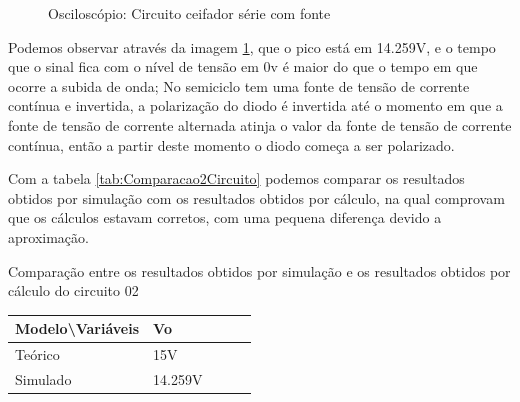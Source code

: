 \begin{figure}[H]
    \centering
    \caption{Osciloscópio: Circuito ceifador série com fonte}
    \vspace{-0.3cm}
    \label{fig:OsciloscopioCircuito02}
\end{figure}

Podemos observar através da imagem \ref{fig:OsciloscopioCircuito02}, que o pico está em 14.259V, e o tempo que o sinal fica com o nível de tensão em 0v é maior do que o tempo em que ocorre a subida de onda; No semiciclo tem uma fonte de tensão de corrente contínua e invertida, a polarização do diodo é invertida até o momento em que a fonte de tensão de corrente alternada atinja o valor da fonte de tensão de corrente contínua, então a partir deste momento o diodo começa a ser polarizado.

Com a tabela \ref{tab:Comparacao2Circuito} podemos comparar os resultados obtidos por simulação com os resultados obtidos por cálculo, na qual comprovam que os cálculos estavam corretos, com uma pequena diferença devido a aproximação.

\begin{quadro}[H]
    \centering
    \caption{Comparação entre os resultados obtidos por simulação e os resultados obtidos por cálculo do circuito 02}
    \begin{tabular}{|C{0.34\textwidth}|C{0.19\textwidth}|C{0.19\textwidth}|C{0.19\textwidth}|C{0.19\textwidth}|}
        \hline
        \textbf{Modelo\textbackslash{}Variáveis} & \textbf{Vo} \\
        \hline
        Teórico & 15V \\
        \hline
        Simulado & 14.259V \\
        \hline
    \end{tabular}
    \vspace{-0.6cm}
    \label{tab:Comparacao2Circuito}
\end{quadro}

